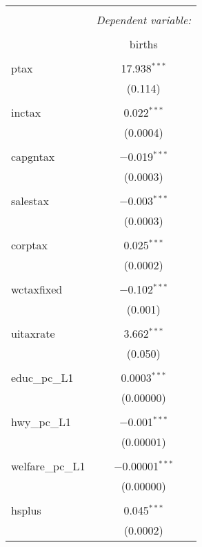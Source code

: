 \documentclass{article}
\begin{document}
\begin{table}[!htbp] \centering 
  \caption{} 
  \label{} 
\begin{tabular}{@{\extracolsep{5pt}}lc} 
\\[-1.8ex]\hline 
\hline \\[-1.8ex] 
 & \multicolumn{1}{c}{\textit{Dependent variable:}} \\ 
\cline{2-2} 
\\[-1.8ex] & births \\ 
\hline \\[-1.8ex] 
 ptax & 17.938$^{***}$ \\ 
  & (0.114) \\ 
  & \\ 
 inctax & 0.022$^{***}$ \\ 
  & (0.0004) \\ 
  & \\ 
 capgntax & $-$0.019$^{***}$ \\ 
  & (0.0003) \\ 
  & \\ 
 salestax & $-$0.003$^{***}$ \\ 
  & (0.0003) \\ 
  & \\ 
 corptax & 0.025$^{***}$ \\ 
  & (0.0002) \\ 
  & \\ 
 wctaxfixed & $-$0.102$^{***}$ \\ 
  & (0.001) \\ 
  & \\ 
 uitaxrate & 3.662$^{***}$ \\ 
  & (0.050) \\ 
  & \\ 
 educ\_pc\_L1 & 0.0003$^{***}$ \\ 
  & (0.00000) \\ 
  & \\ 
 hwy\_pc\_L1 & $-$0.001$^{***}$ \\ 
  & (0.00001) \\ 
  & \\ 
 welfare\_pc\_L1 & $-$0.00001$^{***}$ \\ 
  & (0.00000) \\ 
  & \\ 
 hsplus & 0.045$^{***}$ \\ 
  & (0.0002) \\ 

\end{tabular}
\end{table}
\end{document}
